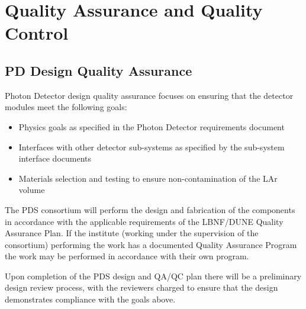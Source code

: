 \section{Quality Assurance and Quality Control}
\label{sec:fdsp-pd-qaqc}




\subsection{PD Design Quality Assurance}
\label{sec:fdsp-pd-designqa}

Photon Detector design quality assurance focuses on ensuring that the detector modules meet the following goals:
\begin{itemize}
\item Physics goals as specified in the Photon Detector requirements document
\item Interfaces with other detector sub-systems as specified by the sub-system interface documents
\item Materials selection and testing to ensure non-contamination of the LAr volume
\end{itemize}

The PDS consortium will perform the design and fabrication of the components in accordance with the applicable requirements of the LBNF/DUNE Quality Assurance Plan. If the institute (working under the supervision of the consortium) performing the work has a documented Quality Assurance Program the work may be performed in accordance with their own program.

Upon completion of the PDS design and QA/QC plan there will be a preliminary design review process, with the reviewers charged to ensure that the design demonstrates compliance with the goals above.

